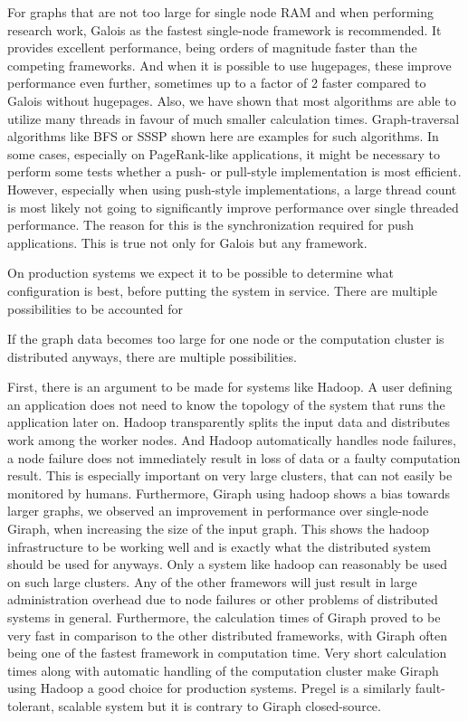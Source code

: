 For graphs that are not too large for single node RAM and when performing research work, Galois as the fastest single-node framework is recommended.
It provides excellent performance, being orders of magnitude faster than the competing frameworks. And when it is possible to use hugepages, these improve performance even further, sometimes up to a factor of 2 faster compared to Galois without hugepages.
Also, we have shown that most algorithms are able to utilize many threads in favour of much smaller calculation times. Graph-traversal algorithms like BFS or SSSP shown here are examples for such algorithms.
In some cases, especially on PageRank-like applications, it might be necessary to perform some tests whether a push- or pull-style implementation is most efficient.
However, especially when using push-style implementations, a large thread count is most likely not going to significantly improve performance over single threaded performance. The reason for this is the synchronization required for push applications. This is true not only for Galois but any framework.







On production systems we expect it to be possible to determine what configuration is best, before putting the system in service.
There are multiple possibilities to be accounted for



If the graph data becomes too large for one node or the computation cluster is distributed anyways, there are multiple possibilities.

First, there is an argument to be made for systems like Hadoop.
A user defining an application does not need to know the topology of the system that runs the application later on.
Hadoop transparently splits the input data and distributes work among the worker nodes.
And Hadoop automatically handles node failures, a node failure does not immediately result in loss of data or a faulty computation result.
This is especially important on very large clusters, that can not easily be monitored by humans.
Furthermore, Giraph using hadoop shows a bias towards larger graphs, we observed an improvement in performance over single-node Giraph, when increasing the size of the input graph.
This shows the hadoop infrastructure to be working well and is exactly what the distributed system should be used for anyways. 
Only a system like hadoop can reasonably be used on such large clusters.
Any of the other framewors will just result in large administration overhead due to node failures or other problems of distributed systems in general.
Furthermore, the calculation times of Giraph proved to be very fast in comparison to the other distributed frameworks, with Giraph often being one of the fastest framework in computation time.
Very short calculation times along with automatic handling of the computation cluster make Giraph using Hadoop a good choice for production systems.
Pregel is a similarly fault-tolerant, scalable system but it is contrary to Giraph closed-source.


